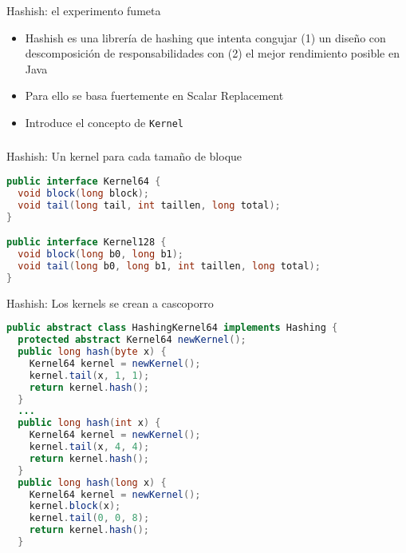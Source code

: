 \begin{frame}[fragile]
  \frametitle{\ft}
  \begin{block}{Hashish: el experimento fumeta}
    \begin{itemize}
    \item Hashish es una librería de hashing que intenta congujar
      (1) un diseño con descomposición de responsabilidades
      con (2) el mejor rendimiento posible en Java
    \item Para ello se basa fuertemente en Scalar Replacement
    \item Introduce el concepto de {\tt Kernel}
    \end{itemize}
  \end{block}
\end{frame}


\begin{frame}[fragile]
  \frametitle{\ft}
  \begin{block}{Hashish: Un kernel para cada tamaño de bloque}
    \begin{lstlisting}[language=java]
public interface Kernel64 {
  void block(long block);
  void tail(long tail, int taillen, long total);
}

public interface Kernel128 {
  void block(long b0, long b1);
  void tail(long b0, long b1, int taillen, long total);
}
    \end{lstlisting}
  \end{block}
\end{frame}


\begin{frame}[fragile]
  \begin{block}{Hashish: Los kernels se crean a cascoporro}
    \begin{lstlisting}[language=java]
public abstract class HashingKernel64 implements Hashing {
  protected abstract Kernel64 newKernel();
  public long hash(byte x) {
    Kernel64 kernel = newKernel();
    kernel.tail(x, 1, 1);
    return kernel.hash();
  }
  ...
  public long hash(int x) {
    Kernel64 kernel = newKernel();
    kernel.tail(x, 4, 4);
    return kernel.hash();
  }
  public long hash(long x) {
    Kernel64 kernel = newKernel();
    kernel.block(x);
    kernel.tail(0, 0, 8);
    return kernel.hash();
  }
    \end{lstlisting}
  \end{block}
\end{frame}


